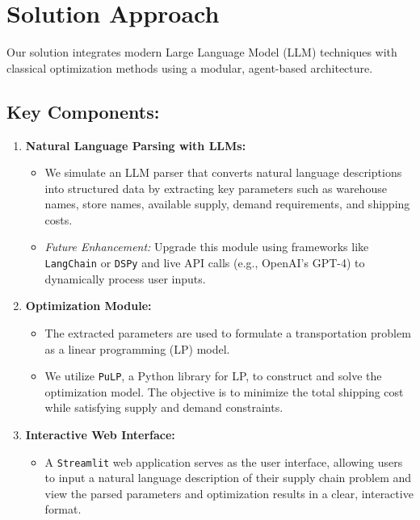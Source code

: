 \documentclass[11pt]{article}
\begin{document}
\section{Solution Approach}
Our solution integrates modern Large Language Model (LLM) techniques with classical optimization methods using a modular, agent-based architecture.

\subsection*{Key Components:}
\begin{enumerate}[label=\arabic*.]
    \item \textbf{Natural Language Parsing with LLMs:}
    \begin{itemize}
        \item We simulate an LLM parser that converts natural language descriptions into structured data by extracting key parameters such as warehouse names, store names, available supply, demand requirements, and shipping costs.
        \item \emph{Future Enhancement:} Upgrade this module using frameworks like \texttt{LangChain} or \texttt{DSPy} and live API calls (e.g., OpenAI’s GPT-4) to dynamically process user inputs.
    \end{itemize}
    \item \textbf{Optimization Module:}
    \begin{itemize}
        \item The extracted parameters are used to formulate a transportation problem as a linear programming (LP) model.
        \item We utilize \texttt{PuLP}, a Python library for LP, to construct and solve the optimization model. The objective is to minimize the total shipping cost while satisfying supply and demand constraints.
    \end{itemize}
    \item \textbf{Interactive Web Interface:}
    \begin{itemize}
        \item A \texttt{Streamlit} web application serves as the user interface, allowing users to input a natural language description of their supply chain problem and view the parsed parameters and optimization results in a clear, interactive format.
    \end{itemize}
\end{enumerate}
\end{document}
